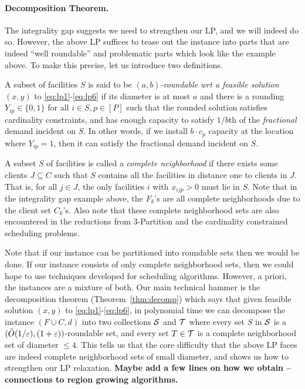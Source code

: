 \paragraph{Decomposition Theorem.}
The integrality gap suggests we need to strengthen our LP, and we will indeed do so. However, the above LP suffices to tease out the instance into parts that are indeed ``well roundable'' and problematic parts which look like the example above.
To make this precise, let us introduce two definitions.  
\begin{asparaitem}
\item A subset of facilities $S$ is said to be {\em $(a,b)$-roundable wrt a feasible solution $(x,y)$} to \eqref{eq:lp1}-\eqref{eq:lp6} if its diameter is at most $a$ and there is a rounding $Y_{ip}\in \{0,1\}$ for all $i\in S,p\in [P]$
such that the rounded solution satisfies cardinality constraints, and  has enough capacity to satisfy $1/b$th of  the {\em fractional} demand incident on $S$. In other words, if we install $b\cdot c_p$ capacity at the location where $Y_{ip} = 1$, then it can satisfy the fractional demand incident on $S$.
\item 
A subset $S$ of facilities is called a {\em complete neighborhood} if there exists some clients $J\subseteq C$ such that $S$ contains all the facilities in distance one to clients in $J$.  That is, for all $j\in J$, the only facilities $i$ with $x_{ijp} > 0$ must lie in $S$.
Note that in the integrality gap example above, the $F_k$'s are all complete neighborhoods due to the client set $C_k$'s. Also note that these complete neighborhood sets are also encountered in the reductions from $3$-Partition and the cardinality constrained scheduling problems.
\end{asparaitem}

Note that if our instance can be partitioned into roundable sets then we would be done. If our instance consists of only complete neighborhood sets, then we could hope to use techniques developed for scheduling algorithms. However, a priori, the instances are a mixture of both.
Our main technical hammer is the decomposition theorem (Theorem~\ref{thm:decomp}) which says that given feasible solution $(x,y)$ to \eqref{eq:lp1}-\eqref{eq:lp6}, in polynomial time we can decompose the instance $(F\cup C,d)$ into two collections ${\cal S}$ and ${\cal T}$ where
every set $S$ in ${\cal S}$ is a $(\tilde{O}(1/\varepsilon),(1+\varepsilon))$-roundable set, and every set $T\in {\cal T}$ is a complete neighborhood set of diameter $\leq 4$. This tells us that the core difficulty that the above LP faces are indeed complete neighborhood sets of small diameter, and shows us how to strengthen our LP relaxation. {\bf Maybe add a few lines on how we obtain -- connections to region growing algorithms.} \medskip

